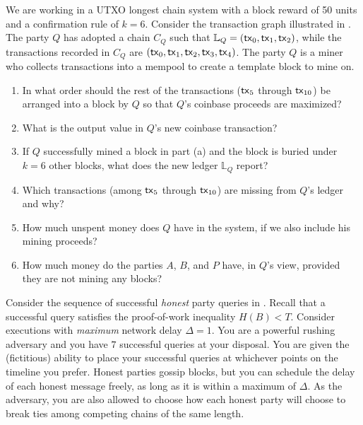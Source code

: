 \begin{problems}
  \item We are working in a UTXO longest chain system with a block reward of 50 units and a confirmation rule of $k = 6$.
        Consider the transaction graph illustrated in .
        The party $Q$ has adopted a chain $C_Q$ such that $\mathbb{L}_Q = (\mathsf{tx}_0, \mathsf{tx}_1, \mathsf{tx}_2)$,
        while the transactions recorded in $C_Q$ are $(\mathsf{tx}_0, \mathsf{tx}_1, \mathsf{tx}_2, \mathsf{tx}_3, \mathsf{tx}_4)$. 
        The party $Q$ is a miner who collects transactions into a mempool to create a template block to mine on.
        \label{problem.tx-graph-2}
        \begin{enumerate}
          \item In what order should the rest of the transactions ($\mathsf{tx}_5$ through $\mathsf{tx}_{10}$) be arranged into a block by $Q$
                so that $Q$'s coinbase proceeds are maximized?
          \item What is the output value in $Q$'s new coinbase transaction?
          \item If $Q$ successfully mined a block in part (a) and the block is buried under $k = 6$ other blocks,
                what does the new ledger $\mathbb{L}_Q$ report?
          \item Which transactions (among $\mathsf{tx}_5$ through $\mathsf{tx}_{10}$) are missing from $Q$'s ledger and why?
          \item How much unspent money does $Q$ have in the system, if we also include his mining proceeds?
          \item How much money do the parties $A$, $B$, and $P$ have, in $Q$'s view, provided they are not mining any blocks?
        \end{enumerate}
      
    \item Consider the sequence of successful \emph{honest} party queries in .
          Recall that a successful query satisfies the proof-of-work inequality $H(B) < T$.
          Consider executions with \emph{maximum} network delay $\Delta = 1$.
          You are a powerful rushing adversary and you have $7$ successful queries at your disposal.
          You are given the (fictitious) ability to place your successful queries at whichever points on the timeline you prefer.
          Honest parties gossip blocks, but you can schedule the delay of each honest message freely, as long as it is within a maximum of $\Delta$.
          As the adversary, you are also allowed to choose how each honest party will choose to break ties among competing chains of the same length.


\end{problems}
